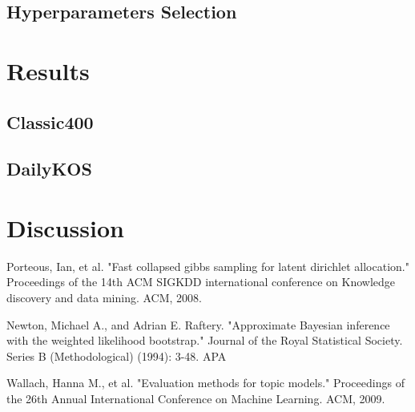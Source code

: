 \documentclass[twoside,12pt]{article}
\begin{document}
\subsection{Hyperparameters Selection}

\section{Results}


\subsection{Classic400}
\subsection{DailyKOS}

\section{Discussion}



\begin{thebibliography}{9}
Porteous, Ian, et al. "Fast collapsed gibbs sampling for latent dirichlet allocation." Proceedings of the 14th ACM SIGKDD international conference on Knowledge discovery and data mining. ACM, 2008.


Newton, Michael A., and Adrian E. Raftery. "Approximate Bayesian inference with the weighted likelihood bootstrap." Journal of the Royal Statistical Society. Series B (Methodological) (1994): 3-48.
APA	

Wallach, Hanna M., et al. "Evaluation methods for topic models." Proceedings of the 26th Annual International Conference on Machine Learning. ACM, 2009.

\end{thebibliography}
\end{document}

